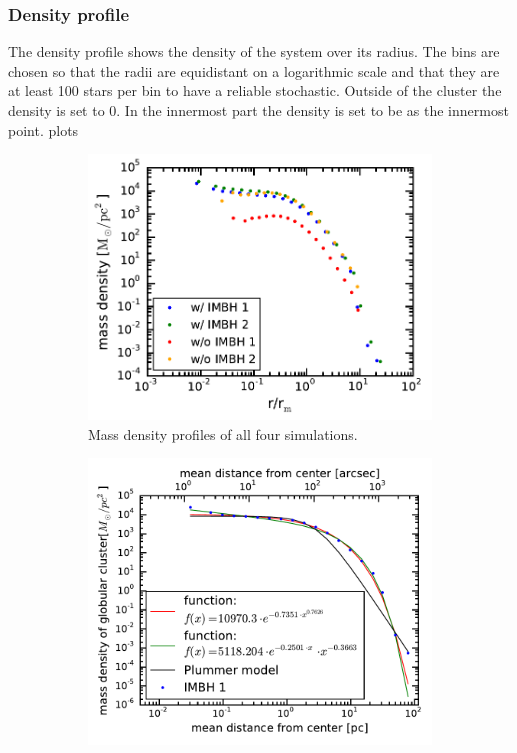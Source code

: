 \subsubsection{Density profile}
The density profile shows the density of the system over its radius. The bins are chosen so that the radii are equidistant on a logarithmic scale and that they are at least 100 stars per bin to have a reliable stochastic. Outside of the cluster the density is set to 0. In the innermost part the density is set to be as the innermost point.
plots\\
\begin{figure}
	\centering
	\begin{subfigure}{0.475\textwidth}
		\centering
		\includegraphics[width=\textwidth]{Plots/density_profiles.pdf}
		\caption{Mass density profiles of all four simulations.}
		\label{mass_dens_points}
	\end{subfigure}
	\hfill
	\begin{subfigure}{0.475\textwidth}
		\centering
		\includegraphics[width=\textwidth]{Plots/density_prof_analytic.pdf}

\end{subfigure}
\end{figure}
